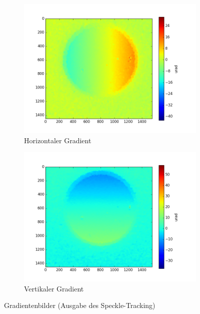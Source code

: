 \begin{figure}[htbp]
	\centering
	\begin{subfigure}[b]{0.45\textwidth}
		\centering
		\includegraphics[width=\textwidth]{img/SpeckDisH_E10001_edf_ref_start0001_1-10_edf}
		\caption[Horizontaler Gradient]{Horizontaler Gradient}
		\label{fig:hor_grad}
	\end{subfigure}
	\begin{subfigure}[b]{0.45\textwidth}
		\centering
		\includegraphics[width=\textwidth]{img/SpeckDisV_E10001_edf_ref_start0001_1-10_edf}
		\caption[Vertikaler Gradient]{Vertikaler Gradient}
		\label{fig:vert_grad}
	\end{subfigure}
	\caption[Gradient]{Gradientenbilder (Ausgabe des Speckle-Tracking)}
	\label{fig:gradienten}
\end{figure}


